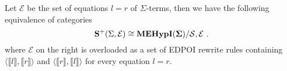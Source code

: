 

\begin{theorem}
\label{thm:full-completeness}
Let $\mathcal{E}$ be the set of equations $l = r$ of $\Sigma$-terms, then we have the following equivalence of categories
\[
	\mathbf{S}^{+}(\Sigma, \mathcal {E} ) \cong {\mathbf{MEHypI(\Sigma)}} / \mathcal{S,E}~.
\]
where $\mathcal{E}$ on the right is overloaded as a set of EDPOI rewrite rules containing $\langle \llbracket l \rrbracket, \llbracket r \rrbracket  \rangle$ and $\langle \llbracket r \rrbracket, \llbracket l \rrbracket  \rangle$ for every equation $l = r$.
\end{theorem}

